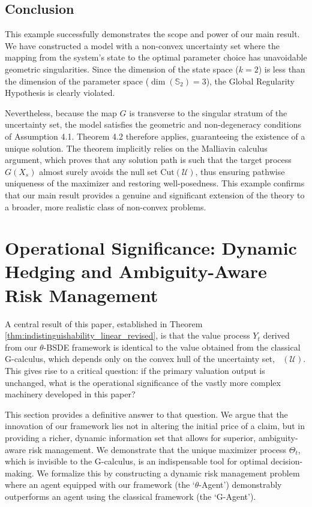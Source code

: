 \documentclass[12pt, letterpaper]{amsart}
\newcommand{\Ucal}{\mathcal{U}}
\DeclareMathOperator*{\overlineconv}{\overline{conv}}
\theoremstyle{plain}
\theoremstyle{definition}
\theoremstyle{remark}
\numberwithin{equation}{section} %
\begin{document}
\begin{appendices}
\subsection{Conclusion}
This example successfully demonstrates the scope and power of our main result. We have constructed a model with a non-convex uncertainty set where the mapping from the system's state to the optimal parameter choice has unavoidable geometric singularities. Since the dimension of the state space ($k=2$) is less than the dimension of the parameter space ($\dim(\mathbb{S}_2)=3$), the Global Regularity Hypothesis is clearly violated.

Nevertheless, because the map $G$ is transverse to the singular stratum of the uncertainty set, the model satisfies the geometric and non-degeneracy conditions of Assumption 4.1. Theorem 4.2 therefore applies, guaranteeing the existence of a unique solution. The theorem implicitly relies on the Malliavin calculus argument, which proves that any solution path is such that the target process $G(X_s)$ almost surely avoids the null set $\mathrm{Cut}(\Ucal)$, thus ensuring pathwise uniqueness of the maximizer and restoring well-posedness. This example confirms that our main result provides a genuine and significant extension of the theory to a broader, more realistic class of non-convex problems.
\end{appendices}

\section{Operational Significance: Dynamic Hedging and Ambiguity-Aware Risk Management}
\label{sec:operational_significance}

A central result of this paper, established in Theorem \ref{thm:indistinguishability_linear_revised}, is that the value process $Y_t$ derived from our $\theta$-BSDE framework is identical to the value obtained from the classical G-calculus, which depends only on the convex hull of the uncertainty set, $\overlineconv(\Ucal)$. This gives rise to a critical question: if the primary valuation output is unchanged, what is the operational significance of the vastly more complex machinery developed in this paper?

This section provides a definitive answer to that question. We argue that the innovation of our framework lies not in altering the initial price of a claim, but in providing a richer, dynamic information set that allows for superior, ambiguity-aware risk management. We demonstrate that the unique maximizer process $\Theta_t$, which is invisible to the G-calculus, is an indispensable tool for optimal decision-making. We formalize this by constructing a dynamic risk management problem where an agent equipped with our framework (the `$\theta$-Agent') demonstrably outperforms an agent using the classical framework (the `G-Agent').
\end{document}
